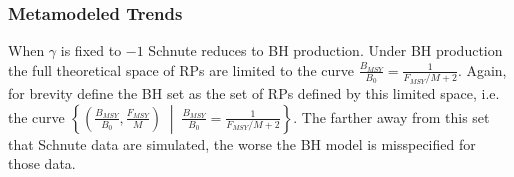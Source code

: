 \documentclass[12pt]{article}
\begin{document}
%
%
%



%
\subsubsection{Metamodeled Trends}


When $\gamma$ is fixed to $-1$  Schnute reduces to BH production. Under BH 
production the full theoretical space of RPs are limited to the curve $\frac{B_{MSY}}{B_0}=\frac{1}{F_{MSY}/M+2}$.
Again, for brevity define the BH set as the set of RPs defined by this limited 
space, i.e. the curve $\left\{\left(\frac{B_{MSY}}{B_0}, \frac{F_{MSY}}{M}\right) \;\middle|\; \frac{B_{MSY}}{B_0}=\frac{1}{F_{MSY}/M+2}\right\}$.
The farther away from this set that Schnute data are simulated, the worse the 
BH model is misspecified for those data. 
\end{document}
